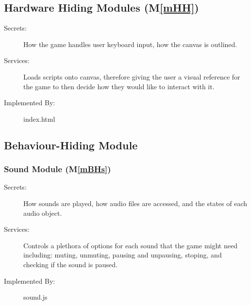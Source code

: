 \documentclass[12pt, titlepage]{article}
\newcommand{\mref}[1]{M\ref{#1}}
\begin{document}
\subsection{Hardware Hiding Modules (\mref{mHH})}


\begin{description}
\item[Secrets:]How the game handles user keyboard input, how the canvas is outlined.
\item[Services:] Loads scripts onto canvas, therefore giving the user a visual reference for the game to then decide how they would like to interact with it.
\item[Implemented By:] index.html
\end{description}

\subsection{Behaviour-Hiding Module}


\subsubsection{Sound Module (\mref{mBHs})}
\begin{description}
\item[Secrets:] How sounds are played, how audio files are accessed, and the states of each audio object.
\item[Services:] Controls a plethora of options for each sound that the game might need including: muting, unmuting, pausing and unpausing, stoping, and checking if the sound is paused.
\item[Implemented By:] sound.js
\end{description}
\end{document}
